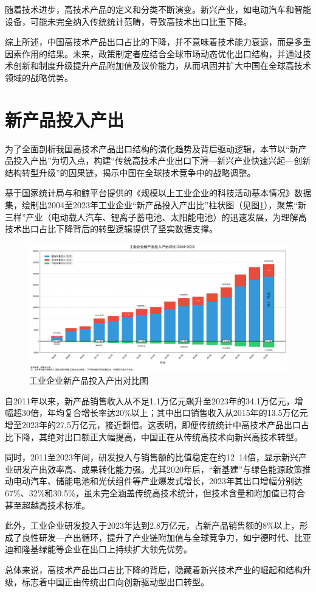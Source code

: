 随着技术进步，高技术产品的定义和分类不断演变。新兴产业，如电动汽车和智能设备，可能未完全纳入传统统计范畴，导致高技术出口比重下降。

综上所述，中国高技术产品出口占比的下降，并不意味着技术能力衰退，而是多重因素作用的结果。\cite{li2021china}未来，政策制定者应结合全球市场动态优化出口结构，并通过技术创新和制度升级提升产品附加值及议价能力，从而巩固并扩大中国在全球高技术领域的战略优势。
\section{新产品投入产出}
为了全面剖析我国高技术产品出口结构的演化趋势及背后驱动逻辑，本节以“新产品投入产出”为切入点，构建“传统高技术产业出口下滑—新兴产业快速兴起—创新结构转型升级”的因果链，揭示中国在全球技术竞争中的战略调整。

基于国家统计局与和鲸平台提供的《规模以上工业企业的科技活动基本情况》数据集，绘制出2004至2023年工业企业“新产品投入产出比”柱状图（见图\ref{工业企业新产品投入产出对比}），聚焦“新三样”产业（电动载人汽车、锂离子蓄电池、太阳能电池）的迅速发展，为理解高技术出口占比下降背后的转型逻辑提供了坚实数据支撑。

\begin{figure}[H]
    \centering
    \includegraphics[width=0.7\linewidth]{figure/24工业企业新产品投入产出对比.png}
    \caption{工业企业新产品投入产出对比图}
    \label{工业企业新产品投入产出对比}
\end{figure}

自2011年以来，新产品销售收入从不足1.1万亿元飙升至2023年的34.1万亿元，增幅超30倍，年均复合增长率达20\%以上；其中出口销售收入从2015年的13.5万亿元增至2023年的27.5万亿元，接近翻倍。这表明，即便传统统计中高技术产品出口占比下降，其绝对出口额正大幅提高，中国正在从传统高技术向新兴高技术转型。

同时，2011至2023年间，研发投入与销售额的比值稳定在约12~14倍，显示新兴产业研发产出效率高、成果转化能力强。尤其2020年后，“新基建”与绿色能源政策推动电动汽车、储能电池和光伏组件等产业爆发式增长，2023年其出口增幅分别达67\%、32\%和30.5\%，虽未完全涵盖传统高技术统计，但技术含量和附加值已符合甚至超越高技术标准。

此外，工业企业研发投入于2023年达到2.8万亿元，占新产品销售额的8\%以上，形成了良性研发—产出循环，提升了产业链附加值与全球竞争力，如宁德时代、比亚迪和隆基绿能等企业在出口上持续扩大领先优势。

总体来说，高技术产品出口占比下降的背后，隐藏着新兴技术产业的崛起和结构升级，标志着中国正由传统出口向创新驱动型出口转型。\cite{zhou2021technological}